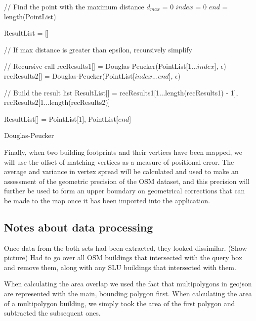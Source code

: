 \documentclass[a4paper]{article}
\begin{document}
\begin{algorithm}[H]
\SetAlgoLined
{}
    // Find the point with the maximum distance\;
    $d_{max}$ = 0\;
    $index$ = 0\;
    $end$ = length(PointList)\;
    

    ResultList = []\;
    
    // If max distance is greater than epsilon, recursively simplify\;
     {
        // Recursive call\;
        recResults1[] = Douglas-Peucker(PointList[1...$index$], $\epsilon$)\;
        recResults2[] = Douglas-Peucker(PointList[$index$...$end$], $\epsilon$)\;

        // Build the result list\;
        ResultList[] = {recResults1[1...length(recResults1) - 1], recResults2[1...length(recResults2)]}\;
    }{
        ResultList[] = {PointList[1], PointList[$end$]}\;
    }
    \;

    \caption{Douglas-Peucker}
\end{algorithm}

Finally, when two building footprints and their vertices have been mapped, we will use the offset of matching vertices as a measure of positional error. The average and variance in vertex spread will be calculated and used to make an assessment of the geometric precision of the OSM dataset, and this precision will further be used to form an upper boundary on geometrical corrections that can be made to the map once it has been imported into the application.

\subsection{Notes about data processing}

Once data from the both sets had been extracted, they looked dissimilar. (Show picture) Had to go over all OSM buildings that intersected with the query box and remove them, along with any SLU buildings that intersected with them.

When calculating the area overlap we used the fact that multipolygons in geojson are represented with the main, bounding polygon first. When calculating the area of a multipolygon building, we simply took the area of the first polygon and subtracted the subsequent ones.
\end{document}
